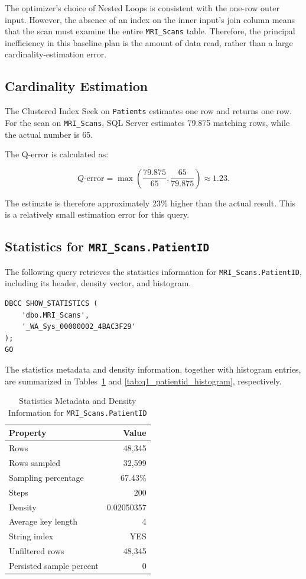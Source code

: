 The optimizer's choice of Nested Loops is consistent with the one-row outer input. However, the absence of an index on the inner input's join column means that the scan must examine the entire \texttt{MRI\_Scans} table. Therefore, the principal inefficiency in this baseline plan is the amount of data read, rather than a large cardinality-estimation error.

\subsection{Cardinality Estimation}

The Clustered Index Seek on \texttt{Patients} estimates one row and returns one row. For the scan on \texttt{MRI\_Scans}, SQL Server estimates 79.875 matching rows, while the actual number is 65.

The Q-error is calculated as:

\[
Q\text{-error}=
\max\left(
\frac{79.875}{65},
\frac{65}{79.875}
\right)
\approx 1.23.
\]

The estimate is therefore approximately 23\% higher than the actual result. This is a relatively small estimation error for this query.

\subsection{Statistics for \texttt{MRI\_Scans.PatientID}}

The following query retrieves the statistics information for \texttt{MRI\_Scans.PatientID}, including its header, density vector, and histogram.

\begin{lstlisting}[caption={Retrieving Q1 statistics for MRI\_Scans.PatientID},
                   label={lst:q1-statistics}]
DBCC SHOW_STATISTICS (
    'dbo.MRI_Scans',
    '_WA_Sys_00000002_4BAC3F29'
);
GO
\end{lstlisting}

The statistics metadata and density information, together with histogram entries, are summarized in Tables~\ref{tab:q1-statistics} and \ref{tab:q1_patientid_histogram}, respectively.

\begin{table}[htbp]
\centering
\caption{Statistics Metadata and Density Information for \texttt{MRI\_Scans.PatientID}}
\label{tab:q1-statistics}
\begin{tabular}{lr}
\toprule
Property & Value \\
\midrule
Rows & 48,345 \\
Rows sampled & 32,599 \\
Sampling percentage & 67.43\% \\
Steps & 200 \\
Density & 0.02050357 \\
Average key length & 4 \\
String index & YES \\
Unfiltered rows & 48,345 \\
Persisted sample percent & 0 \\
\bottomrule
\end{tabular}
\end{table}

